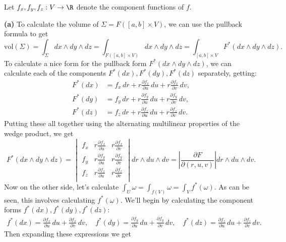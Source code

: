 \documentclass[11pt,letterpaper]{article}
\begin{document}
\begin{solution}
    Let $f_x,f_y,f_z : V \to \R$ denote the component functions of $f$.

    \textbf{(a)} To calculate the volume of $\Sigma=F([a,b]\times V)$, we can use the pullback formula to get
    \[
        \textrm{vol}(\Sigma)=\int_{\Sigma} dx\wedge dy\wedge dz = \int_{F([a,b]\times V)} dx\wedge dy\wedge dz = \int_{[a,b]\times V} F^*(dx\wedge dy\wedge dz)
    .\] 
    To calculate a nice form for the pullback form $F^*(dx\wedge dy\wedge dz)$, we can calculate each of the components $F^*(dx), F^*(dy), F^*(dz)$ separately, getting:
    \[
        \begin{aligned}
            F^*(dx)&=f_x\,dr + r\frac{\partial f_x}{\partial u}\, du+r\frac{\partial f_x}{\partial v}\,dv,\\
            F^*(dy)&=f_y\,dr + r\frac{\partial f_y}{\partial u}\, du+r\frac{\partial f_y}{\partial v}\,dv,\\
            F^*(dz)&=f_z\,dr + r\frac{\partial f_z}{\partial u}\, du+r\frac{\partial f_z}{\partial v}\,dv.
        \end{aligned}
    \]  
    Putting these all together using the alternating multilinear properties of the wedge product, we get
    \[
        F^*(dx\wedge dy\wedge dz)=\begin{vmatrix}
            f_x&r\frac{\partial f_x}{\partial u}&r\frac{\partial f_x}{\partial v}\\[1ex]
            f_y&r\frac{\partial f_y}{\partial u}&r\frac{\partial f_y}{\partial v}\\[1ex]
            f_z&r\frac{\partial f_z}{\partial u}&r\frac{\partial f_z}{\partial v}\\
        \end{vmatrix}dr\wedge du\wedge dv = \left|\frac{\partial F}{\partial (r,u,v)}\right| dr\wedge du\wedge dv
    .\] 
    Now on the other side, let's calculate $\int_U \omega = \int_{f(V)} \omega = \int_V f^*(\omega)$. As can be seen, this involves calculating $f^*(\omega)$. We'll begin by calculating the component forms $f^*(dx), f^*(dy), f^*(dz)$: 
    \[
        \begin{aligned}
            f^*(dx)=\frac{\partial f_x}{\partial u}\, du+\frac{\partial f_x}{\partial v}\,dv,\quad
            f^*(dy)=\frac{\partial f_y}{\partial u}\, du+\frac{\partial f_y}{\partial v}\,dv,\quad
            f^*(dz)=\frac{\partial f_z}{\partial u}\, du+\frac{\partial f_z}{\partial v}\,dv.
        \end{aligned}
    \]
    Then expanding these expressions we get

\end{solution}
\end{document}

